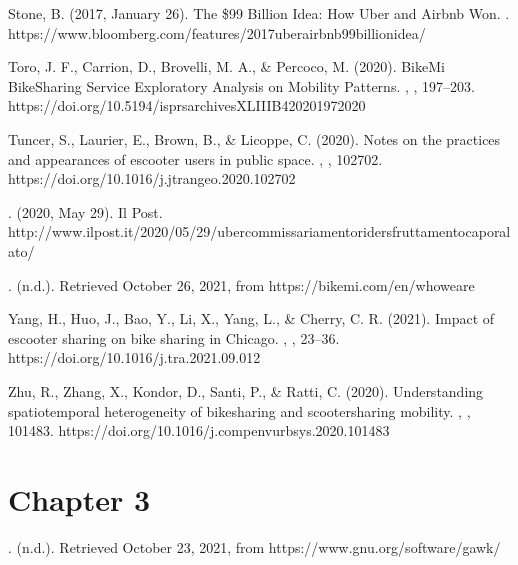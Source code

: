 \documentclass[letterpaper,10pt,english]{jupyterBook}
\begin{document}
\sphinxAtStartPar
Stone, B. (2017, January 26). The \$99 Billion Idea: How Uber and Airbnb Won. . https://www.bloomberg.com/features/2017\sphinxhyphen{}uber\sphinxhyphen{}airbnb\sphinxhyphen{}99\sphinxhyphen{}billion\sphinxhyphen{}idea/

\sphinxAtStartPar
Toro, J. F., Carrion, D., Brovelli, M. A., \& Percoco, M. (2020). BikeMi Bike\sphinxhyphen{}Sharing Service Exploratory Analysis on Mobility Patterns. , , 197–203. https://doi.org/10.5194/isprs\sphinxhyphen{}archives\sphinxhyphen{}XLIII\sphinxhyphen{}B4\sphinxhyphen{}2020\sphinxhyphen{}197\sphinxhyphen{}2020

\sphinxAtStartPar
Tuncer, S., Laurier, E., Brown, B., \& Licoppe, C. (2020). Notes on the practices and appearances of e\sphinxhyphen{}scooter users in public space. , , 102702. https://doi.org/10.1016/j.jtrangeo.2020.102702

\sphinxAtStartPar
{}. (2020, May 29). Il Post. http://www.ilpost.it/2020/05/29/uber\sphinxhyphen{}commissariamento\sphinxhyphen{}rider\sphinxhyphen{}sfruttamento\sphinxhyphen{}caporalato/

\sphinxAtStartPar
{}. (n.d.). Retrieved October 26, 2021, from https://bikemi.com/en/who\sphinxhyphen{}we\sphinxhyphen{}are

\sphinxAtStartPar
Yang, H., Huo, J., Bao, Y., Li, X., Yang, L., \& Cherry, C. R. (2021). Impact of e\sphinxhyphen{}scooter sharing on bike sharing in Chicago. , , 23–36. https://doi.org/10.1016/j.tra.2021.09.012

\sphinxAtStartPar
Zhu, R., Zhang, X., Kondor, D., Santi, P., \& Ratti, C. (2020). Understanding spatio\sphinxhyphen{}temporal heterogeneity of bike\sphinxhyphen{}sharing and scooter\sphinxhyphen{}sharing mobility. , , 101483. https://doi.org/10.1016/j.compenvurbsys.2020.101483


\section{Chapter 3}
\label{\detokenize{references:chapter-3}}
\sphinxAtStartPar
{}. (n.d.). Retrieved October 23, 2021, from https://www.gnu.org/software/gawk/
\end{document}
